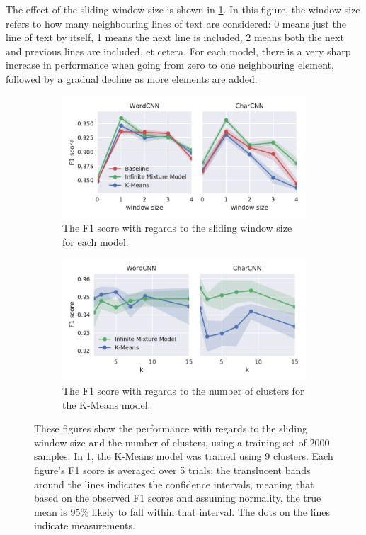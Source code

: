 The effect of the sliding window size is shown in \cref{fig:window}. In this
figure, the window size refers to how many neighbouring lines of text are
considered: 0 means just the line of text by itself, 1 means the next line is
included, 2 means both the next and previous lines are included, et cetera.
For each model, there is a very sharp increase in performance when going from
zero to one neighbouring element, followed by a gradual decline as more elements
are added.
\begin{figure}[p]
  \centering
  \begin{subfigure}[b]{\textwidth}
    \includegraphics[width=\textwidth]{figures/results/2000-windowsize-old/tseries_f1.pdf}
    \caption{The F1 score with regards to the sliding window size for each
    model.\label{fig:window}}
    \vspace*{\fill}
  \end{subfigure}
  \begin{subfigure}[b]{\textwidth}
    \includegraphics[width=\textwidth]{figures/results/2000-numclusters-old/tseries_f1.pdf}
    \caption{The F1 score with regards to the number of clusters for the K-Means
      model.\label{fig:numcluster}}
  \end{subfigure}
  \caption{These figures show the performance with regards to the sliding window
    size and the number of clusters, using a training set of 2000 samples. In
    \cref{fig:window}, the K-Means model was trained using 9 clusters.
    Each figure's F1 score is averaged over 5 trials; the translucent bands
    around the lines indicates the confidence intervals, meaning that based on
    the observed F1 scores and assuming normality, the true mean is 95\% likely
    to fall within that interval. The dots on the lines indicate
    measurements.\label{fig:params}
  }
\end{figure}


